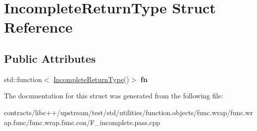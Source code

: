 \hypertarget{struct_incomplete_return_type}{}\section{Incomplete\+Return\+Type Struct Reference}
\label{struct_incomplete_return_type}
\subsection*{Public Attributes}
\begin{DoxyCompactItemize}
\item 
\mbox{\label{struct_incomplete_return_type_ae30e180a7e983e9540433a3c5dd03636}} 
std\+::function$<$ \mbox{\hyperlink{struct_incomplete_return_type}{Incomplete\+Return\+Type}}()$>$ {\bfseries fn}
\end{DoxyCompactItemize}


The documentation for this struct was generated from the following file\+:\begin{DoxyCompactItemize}
\item 
contracts/libc++/upstream/test/std/utilities/function.\+objects/func.\+wrap/func.\+wrap.\+func/func.\+wrap.\+func.\+con/F\+\_\+incomplete.\+pass.\+cpp\end{DoxyCompactItemize}
